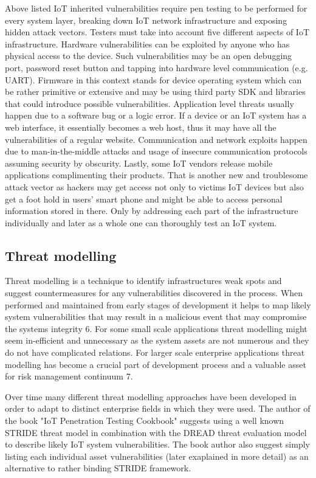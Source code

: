 Above listed IoT inherited vulnerabilities require pen testing to be performed for every system layer, breaking down IoT network infrastructure and exposing hidden attack vectors. Testers must take into account five different aspects of IoT infrastructure. Hardware vulnerabilities can be exploited by anyone who has physical access to the device. Such vulnerabilities may be an open debugging port, password reset button and tapping into hardware level communication (e.g. UART)\cite{attify}. Firmware in this context stands for device operating system which can be rather primitive or extensive and may be using third party SDK and libraries that could introduce possible vulnerabilities\cite {cookbook}. Application level threats usually happen due to a software bug or a logic error\cite{cookbook}. If a device or an IoT system has a web interface, it essentially becomes a web host, thus it may have all the vulnerabilities of a regular website\cite{2007:WAH:1406550}. Communication and network exploits happen due to man-in-the-middle attacks and usage of insecure communication protocols assuming security by obscurity. Lastly, some IoT vendors release mobile applications complimenting their products. That is another new and troublesome attack vector as hackers may get access not only to victims IoT devices but also get a foot hold in users' smart phone and might be able to access personal information stored in there\cite{cookbook}. Only by addressing each part of the infrastructure individually and later as a whole one can thoroughly test an IoT system.

\subsection{Threat modelling}\label{iot-threat-modelling}

Threat modelling is a technique to identify infrastructures weak spots and suggest countermeasures for any vulnerabilities discovered in the process. When performed and maintained from early stages of development it helps to map likely system vulnerabilities that may result in a malicious event that may compromise the systems integrity {6}. For some small scale applications threat modelling might seem in-efficient and unnecessary as the system assets are not numerous and they do not have complicated relations. For larger scale enterprise applications threat modelling has become a crucial part of development process and a valuable asset for risk management continuum {7}. 

Over time many different threat modelling approaches have been developed in order to adapt to distinct enterprise fields in which they were used. The author of the book "IoT Penetration Testing Cookbook"\cite{cookbook} suggests using a well known STRIDE threat model in combination with the DREAD threat evaluation model to describe likely IoT system vulnerabilities. The book author also suggest simply listing each individual asset vulnerabilities (later exaplained in more detail) as an alternative to rather binding STRIDE framework\cite{cookbook}.

